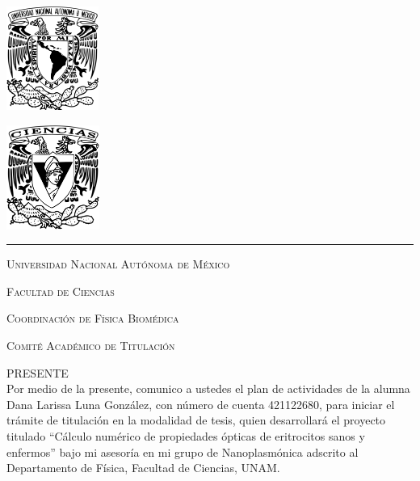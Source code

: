 \documentclass[11pt,letterpaper]{article}
\begin{document}
	
	
	\begin{center}
		\begin{minipage}{3cm}
			\begin{center}
				\includegraphics[height=3.4cm]{Logo_UNAM (1)}
			\end{center}
		\end{minipage}\hfill
		\begin{minipage}{3cm}
			\begin{center}
				\includegraphics[height=3.4cm]{Logo_FC (1)}
			\end{center}
		\end{minipage}
	\end{center}
	
	\rule{17cm}{0.1mm}
	
	\vspace{0.5cm}
	
	\hspace{10cm}{\raggedleft Ciudad Universitaria, 22 de abril de 2025}
	
	\hspace{1cm}
	
	\vspace{0.5cm}
	
	\textsc{Universidad Nacional Autónoma de México}
	
	\textsc{Facultad de Ciencias
	}
	
	\textsc{Coordinación de Física Biomédica
	}
	
	\textsc{Comité Académico de Titulación
	}
	
	\textsc{PRESENTE}\\
	
	\noindent
	Por medio de la presente, comunico a ustedes el plan de actividades de la alumna Dana Larissa Luna González, con número de cuenta 421122680, para  iniciar el trámite de titulación en la modalidad de tesis, quien desarrollará el proyecto titulado ``Cálculo numérico de propiedades ópticas de eritrocitos sanos y enfermos'' bajo mi asesoría en mi grupo de Nanoplasmónica adscrito al Departamento de Física, Facultad de Ciencias, UNAM.\\
	
\end{document}
